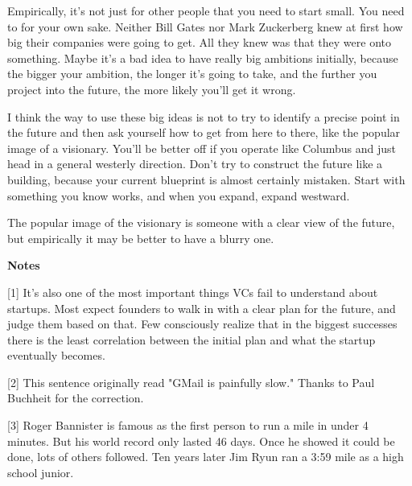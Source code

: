 Empirically,
                  it's not just for other people that you need to start small.
                  You need to for your own sake. Neither Bill Gates nor Mark
                  Zuckerberg knew at first how big their companies were going to
                  get. All they knew was that they were onto something. Maybe
                  it's a bad idea to have really big ambitions initially,
                  because the bigger your ambition, the longer it's going to
                  take, and the further you project into the future, the more
                  likely you'll get it wrong.

I think the way to use
                  these big ideas is not to try to identify a precise point in
                  the future and then ask yourself how to get from here to
                  there, like the popular image of a visionary. You'll be better
                  off if you operate like Columbus and just head in a general
                  westerly direction. Don't try to construct the future like a
                  building, because your current blueprint is almost certainly
                  mistaken. Start with something you know works, and when you
                  expand, expand westward.

The popular image of the
                  visionary is someone with a clear view of the future, but
                  empirically it may be better to have a blurry one.





\textbf{Notes}

[1] It's also one of the most important things VCs fail to
                  understand about startups. Most expect founders to walk in
                  with a clear plan for the future, and judge them based on
                  that. Few consciously realize that in the biggest successes
                  there is the least correlation between the initial plan and
                  what the startup eventually becomes.

[2] This sentence originally read "GMail is painfully slow."
                  Thanks to Paul Buchheit for the correction.

[3] Roger Bannister is famous as the first person to run a mile
                  in under 4 minutes. But his world record only lasted 46 days.
                  Once he showed it could be done, lots of others followed. Ten
                  years later Jim Ryun ran a 3:59 mile as a high school
                  junior.


